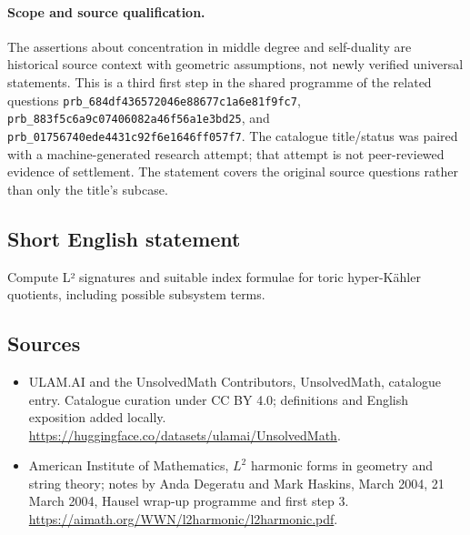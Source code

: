 \documentclass[11pt]{article}
\begin{document}
\paragraph{Scope and source qualification.}The assertions about concentration in middle degree and self-duality are historical source context with geometric assumptions, not newly verified universal statements. This is a third first step in the shared programme of the related questions \texttt{prb\_684df436572046e88677c1a6e81f9fc7}, \texttt{prb\_883f5c6a9c07406082a46f56a1e3bd25}, and \texttt{prb\_01756740ede4431c92f6e1646ff057f7}. The catalogue title/status was paired with a machine-generated research attempt; that attempt is not peer-reviewed evidence of settlement. The statement covers the original source questions rather than only the title’s subcase.
\subsection{Short English statement}
Compute L² signatures and suitable index formulae for toric hyper-Kähler quotients, including possible subsystem terms.
\subsection{Sources}
\begin{itemize}
\item[\hypertarget{source:statement:1}{S1}] ULAM.AI and the UnsolvedMath Contributors, UnsolvedMath, catalogue entry. Catalogue curation under CC BY 4.0; definitions and English exposition added locally.
\url{https://huggingface.co/datasets/ulamai/UnsolvedMath}.
\item[\hypertarget{source:statement:2}{S2}] American Institute of Mathematics, $L^2$ harmonic forms in geometry and string theory; notes by Anda Degeratu and Mark Haskins, March 2004, 21 March 2004, Hausel wrap-up programme and first step 3.
\url{https://aimath.org/WWN/l2harmonic/l2harmonic.pdf}.
\end{itemize}
\label{end:statement}
\end{document}
